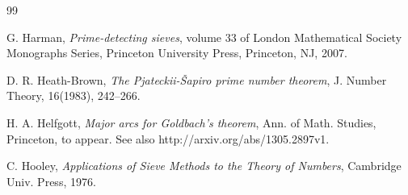 \documentclass{amsart}
\numberwithin{equation}{subsection}
\begin{document}
\begin{thebibliography}{99}









  G. Harman, \textit{Prime-detecting sieves}, volume 33 of London  Mathematical  Society Monographs Series, Princeton University Press, Princeton, NJ, 2007.



 D. R. Heath-Brown, \textit{The Pjateckii-\v{S}apiro prime number theorem}, J. Number Theory, 16(1983), 242--266.


 H. A. Helfgott, \textit{Major arcs for Goldbach's theorem},  Ann. of Math. Studies, Princeton, to appear. See also http://arxiv.org/abs/1305.2897v1.

 C. Hooley, \textit{Applications of Sieve Methods to the Theory of Numbers}, Cambridge Univ. Press, 1976.





\end{thebibliography}
\end{document}
